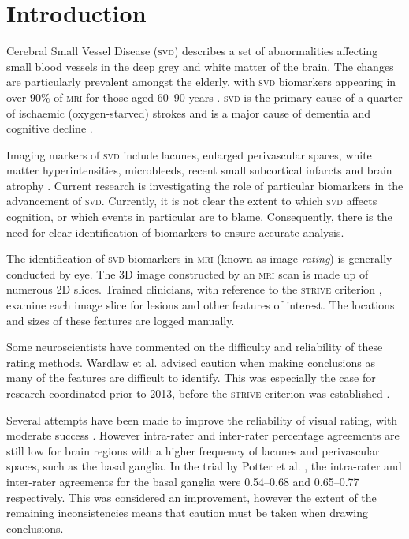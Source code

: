 %
%

\chapter{Introduction}\label{s-intro}

{\noindent} Cerebral Small Vessel Disease (\textsc{svd}) describes a set of abnormalities affecting small blood vessels in the deep grey and white matter of the brain. The changes are particularly prevalent amongst the elderly, with \textsc{svd} biomarkers appearing in over 90\% of \textsc{mri} for those aged 60--90 years \cite{deLeeuwF-E2001Pocw}. \textsc{svd} is the primary cause of a quarter of ischaemic (oxygen-starved) strokes \cite{WardlawJ.M.2013Nsfr} and is a major cause of dementia and cognitive decline \cite{NorrvingBo2008Linb}.

Imaging markers of \textsc{svd} include lacunes, enlarged perivascular spaces, white matter hyperintensities, microbleeds, recent small subcortical infarcts and brain atrophy \cite{WardlawJ.M.2013Nsfr}. Current research is investigating the role of particular biomarkers in the advancement of \textsc{svd}. Currently, it is not clear the extent to which \textsc{svd} affects cognition, or which events in particular are to blame. Consequently, there is the need for clear identification of biomarkers to ensure accurate analysis.

The identification of \textsc{svd} biomarkers in \textsc{mri} (known as image \textit{rating}) is generally conducted by eye. The 3D image constructed by an \textsc{mri} scan is made up of numerous 2D slices. Trained clinicians, with reference to the \textsc{strive} criterion \cite{WardlawJ.M.2013Nsfr}, examine each image slice for lesions and other features of interest. The locations and sizes of these features are logged manually.

Some neuroscientists have commented on the difficulty and reliability of these rating methods. Wardlaw et al. \cite{WardlawJm2013Mosc} advised caution when making conclusions as many of the features are difficult to identify. This was especially the case for research coordinated prior to 2013, before the \textsc{strive} criterion was established \cite{WardlawJ.M.2013Nsfr}.

Several attempts have been made to improve the reliability of visual rating, with moderate success \cite{AdamsH.H.Hieab2013RMfD, PotterGillian2015CPSV}. However intra-rater and inter-rater percentage agreements are still low for brain regions with a higher frequency of lacunes and perivascular spaces, such as the basal ganglia. In the trial by Potter et al. \cite{PotterGillian2015CPSV},  the intra-rater and inter-rater agreements for the basal ganglia were 0.54--0.68 and 0.65--0.77 respectively. This was considered an improvement, however the extent of the remaining inconsistencies means that caution must be taken when drawing conclusions.

